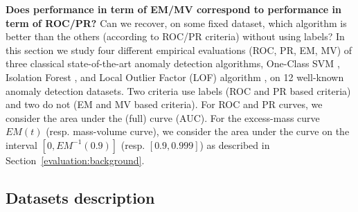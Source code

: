 \textbf{Does performance in term of EM/MV correspond to performance in term of ROC/PR?} Can we recover, on some fixed dataset, which algorithm is better than the others (according to ROC/PR criteria) without using labels?
In this section we study four different empirical evaluations (ROC, PR, EM, MV) of three classical state-of-the-art anomaly detection algorithms, One-Class SVM  \cite{Scholkopf2001}, Isolation Forest \cite{Liu2008}, and Local Outlier Factor (LOF) algorithm \cite{Breunig2000LOF}, on 12 well-known anomaly detection datasets. Two criteria use labels (ROC and PR based criteria) and two do not (EM and MV based criteria).
For ROC and PR curves, we consider the area under the (full) curve (AUC). For the excess-mass curve $EM(t)$ (resp. mass-volume curve), we consider the area under the curve on the interval $[0, EM^{-1}(0.9)]$ (resp. $[0.9, 0.999]$) as described in Section~\ref{evaluation:background}.

\subsection{Datasets description}

